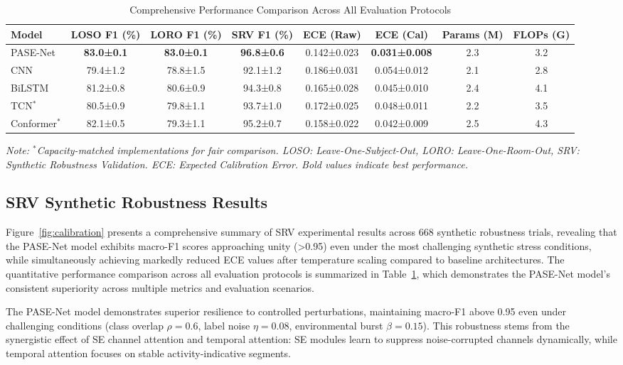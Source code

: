 \documentclass[journal]{IEEEtran}
\begin{document}
\begin{table}[t]
\centering
\caption{Comprehensive Performance Comparison Across All Evaluation Protocols}
\label{tab:performance_comparison}
\small
\begin{tabular}{@{}lccccccc@{}}
\toprule
\textbf{Model} & \textbf{LOSO F1 (\%)} & \textbf{LORO F1 (\%)} & \textbf{SRV F1 (\%)} & \textbf{ECE (Raw)} & \textbf{ECE (Cal)} & \textbf{Params (M)} & \textbf{FLOPs (G)} \\
\midrule
PASE-Net & \textbf{83.0±0.1} & \textbf{83.0±0.1} & \textbf{96.8±0.6} & 0.142±0.023 & \textbf{0.031±0.008} & 2.3 & 3.2 \\
CNN & 79.4±1.2 & 78.8±1.5 & 92.1±1.2 & 0.186±0.031 & 0.054±0.012 & 2.1 & 2.8 \\
BiLSTM & 81.2±0.8 & 80.6±0.9 & 94.3±0.8 & 0.165±0.028 & 0.045±0.010 & 2.4 & 4.1 \\
TCN$^*$ & 80.5±0.9 & 79.8±1.1 & 93.7±1.0 & 0.172±0.025 & 0.048±0.011 & 2.2 & 3.5 \\
Conformer$^*$ & 82.1±0.5 & 79.3±1.1 & 95.2±0.7 & 0.158±0.022 & 0.042±0.009 & 2.5 & 4.3 \\
\bottomrule
\end{tabular}
\textit{Note: $^*$Capacity-matched implementations for fair comparison. LOSO: Leave-One-Subject-Out, LORO: Leave-One-Room-Out, SRV: Synthetic Robustness Validation. ECE: Expected Calibration Error. Bold values indicate best performance.}
\end{table}

\subsection{SRV Synthetic Robustness Results}

Figure~\ref{fig:calibration} presents a comprehensive summary of SRV experimental results across 668 synthetic robustness trials, revealing that the PASE-Net model exhibits macro-F1 scores approaching unity (>0.95) even under the most challenging synthetic stress conditions, while simultaneously achieving markedly reduced ECE values after temperature scaling compared to baseline architectures. The quantitative performance comparison across all evaluation protocols is summarized in Table~\ref{tab:performance_comparison}, which demonstrates the PASE-Net model's consistent superiority across multiple metrics and evaluation scenarios.

The PASE-Net model demonstrates superior resilience to controlled perturbations, maintaining macro-F1 above 0.95 even under challenging conditions (class overlap $\rho=0.6$, label noise $\eta=0.08$, environmental burst $\beta=0.15$). This robustness stems from the synergistic effect of SE channel attention and temporal attention: SE modules learn to suppress noise-corrupted channels dynamically, while temporal attention focuses on stable activity-indicative segments.
\end{document}
